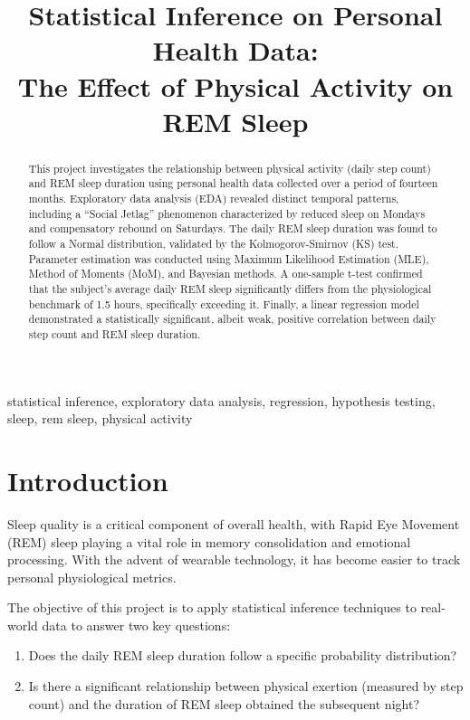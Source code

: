 \documentclass[conference]{IEEEtran}
\title{Statistical Inference on Personal Health Data:\\ The Effect of Physical Activity on REM Sleep}
\author{\IEEEauthorblockN{Yiğit Ateş}
\IEEEauthorblockA{\textit{Institute for Data Science \& Artificial Intelligence} \\
\textit{Boğaziçi University}\\
Istanbul, Turkey \\
2025776009}
}
\begin{document}
\maketitle

\begin{abstract}
This project investigates the relationship between physical activity (daily step count) and REM sleep duration using personal health data collected over a period of fourteen months. Exploratory data analysis (EDA) revealed distinct temporal patterns, including a ``Social Jetlag'' phenomenon characterized by reduced sleep on Mondays and compensatory rebound on Saturdays. The daily REM sleep duration was found to follow a Normal distribution, validated by the Kolmogorov-Smirnov (KS) test. Parameter estimation was conducted using Maximum Likelihood Estimation (MLE), Method of Moments (MoM), and Bayesian methods. A one-sample t-test confirmed that the subject's average daily REM sleep significantly differs from the physiological benchmark of 1.5 hours, specifically exceeding it. Finally, a linear regression model demonstrated a statistically significant, albeit weak, positive correlation between daily step count and REM sleep duration.
\end{abstract}

\begin{IEEEkeywords}
statistical inference, exploratory data analysis, regression, hypothesis testing, sleep, rem sleep, physical activity
\end{IEEEkeywords}

\section{Introduction}
Sleep quality is a critical component of overall health, with Rapid Eye Movement (REM) sleep playing a vital role in memory consolidation and emotional processing. With the advent of wearable technology, it has become easier to track personal physiological metrics.

The objective of this project is to apply statistical inference techniques to real-world data to answer two key questions:
\begin{enumerate}
    \item Does the daily REM sleep duration follow a specific probability distribution?
    \item Is there a significant relationship between physical exertion (measured by step count) and the duration of REM sleep obtained the subsequent night?
\end{enumerate}
\end{document}
